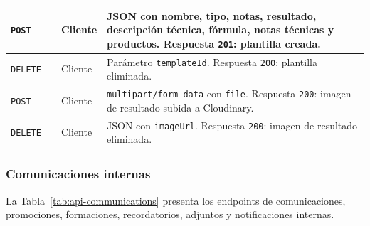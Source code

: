 {\begin{supertabular}{|A{0.10\textwidth}|A{0.27\textwidth}|A{0.15\textwidth}|A{0.38\textwidth}|}
\hline
\texttt{POST} &  & Cliente & JSON con nombre, tipo, notas, resultado, descripción técnica, fórmula, notas técnicas y productos. Respuesta \texttt{201}: plantilla creada.\\
\hline
\texttt{DELETE} &  & Cliente & Parámetro \texttt{templateId}. Respuesta \texttt{200}: plantilla eliminada.\\
\hline
\texttt{POST} &  & Cliente & \texttt{multipart/form-data} con \texttt{file}. Respuesta \texttt{200}: imagen de resultado subida a Cloudinary.\\
\hline
\texttt{DELETE} &  & Cliente & JSON con \texttt{imageUrl}. Respuesta \texttt{200}: imagen de resultado eliminada.\\
\hline
\end{supertabular}
}

\subsubsection{Comunicaciones internas}

La Tabla~\ref{tab:api-communications} presenta los endpoints de comunicaciones, promociones, formaciones, recordatorios, adjuntos y notificaciones internas.

